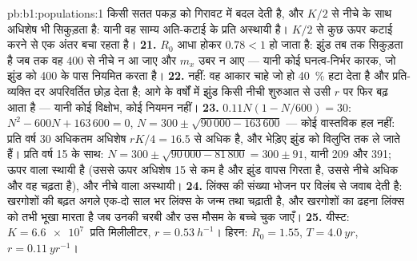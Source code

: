 \begin{solution}{pb:b1:populations:1}
किसी सतत पकड़ को गिरावट में बदल देती है, और $K/2$ से नीचे  के साथ
अधिशेष भी सिकुड़ता है: यानी वह साम्य अति-कटाई के प्रति अस्थायी है।
$K/2$ से कुछ ऊपर कटाई करने से एक अंतर बचा रहता है।
\textbf{21.} $R_0$ आधा होकर $0.78 < 1$ हो जाता है: झुंड तब तक सिकुड़ता है
जब तक वह 400 से नीचे न आ जाए और $m_x$ उबर न आए --- यानी कोई
घनत्व-निर्भर कारक, जो झुंड को 400 के पास नियमित करता है।
\textbf{22.} नहीं: वह आकार चाहे जो हो \qty{40}{\%} हटा देता है और
प्रति-व्यक्ति दर अपरिवर्तित छोड़ देता है; आगे के वर्षों में झुंड
किसी नीची शुरुआत से उसी $r$ पर फिर बढ़ आता है --- यानी कोई विक्षोभ, कोई
नियमन नहीं।
\textbf{23.} $0.11N(1 - N/600) = 30$: $N^2 - 600N + 163\,600 = 0$,
$N = 300\pm\sqrt{90\,000 - 163\,600}$ --- कोई वास्तविक हल नहीं: प्रति वर्ष
30 अधिकतम अधिशेष $rK/4 = 16.5$ से अधिक है, और भेड़िए
झुंड को विलुप्ति तक ले जाते हैं। प्रति वर्ष 15 के साथ: $N = 300\pm\sqrt{90\,000 -
81\,800} = 300\pm 91$, यानी 209 और 391; ऊपर वाला स्थायी है
(उससे ऊपर अधिशेष 15 से कम है और झुंड वापस गिरता है, उससे नीचे अधिक और
वह चढ़ता है), और नीचे वाला अस्थायी।
\textbf{24.} लिंक्स की संख्या भोजन पर विलंब से जवाब देती है: खरगोशों की
बढ़त अगले एक-दो साल भर लिंक्स के जन्म तथा  चढ़ाती है, और
खरगोशों का ढहना लिंक्स को तभी भूखा मारता है जब उनकी चरबी और उस मौसम के
बच्चे चुक जाएँ।
\textbf{25.} यीस्ट: $K = \qty{6.6e7}{}$  प्रति मिलीलीटर, $r =
\qty{0.53}{h^{-1}}$। हिरन: $R_0 = 1.55$, $T = \qty{4.0}{yr}$, $r =
\qty{0.11}{yr^{-1}}$।
\end{solution}
